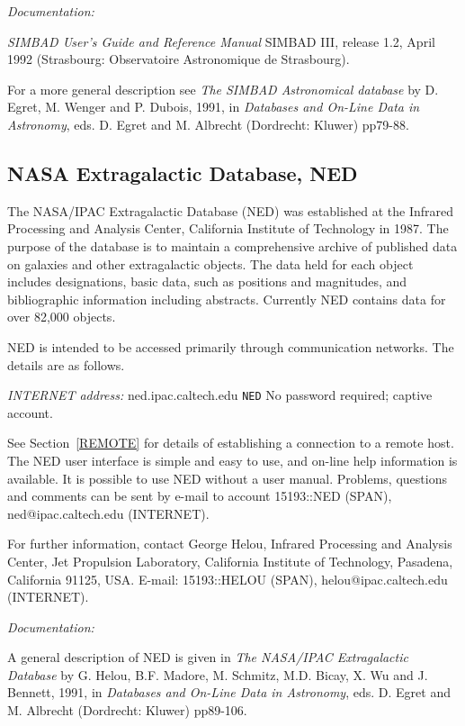 \documentclass[twoside,11pt]{article}
\newcommand{\xlabel}[1]{}
\begin{document}
{\it Documentation:}

{\it SIMBAD User's Guide and Reference Manual} SIMBAD III, release 1.2,
April 1992 (Strasbourg: Observatoire Astronomique de Strasbourg).

For a more general description see {\it The SIMBAD Astronomical
database} by D. Egret, M. Wenger and P. Dubois, 1991, in {\it Databases
and On-Line Data in Astronomy}, eds. D. Egret and M. Albrecht
(Dordrecht: Kluwer) pp79-88.

\subsection{NASA Extragalactic Database, NED
\xlabel{nasa_extragalactic_database_ned}}

The NASA/IPAC Extragalactic Database (NED) was established at the
Infrared Processing and Analysis Center, California Institute of
Technology in 1987. The purpose of the database is to maintain a
comprehensive archive of published data on galaxies and other
extragalactic objects. The data held for each object includes
designations, basic data, such as positions and magnitudes, and
bibliographic information including abstracts. Currently NED contains
data for over 82,000 objects.

NED is intended to be accessed primarily through communication networks.
The details are as follows.

{\it INTERNET address:} ned.ipac.caltech.edu
 \verb-NED-
 No password required; captive account.

See Section~\ref{REMOTE} for details of establishing a connection to
a remote host. The NED user interface is simple and easy to use,
and on-line help information is available. It is possible to use NED
without a user manual. Problems, questions and comments can be sent by
e-mail to account 15193::NED (SPAN), ned@ipac.caltech.edu (INTERNET).

For further information, contact George Helou, Infrared Processing and
Analysis Center, Jet Propulsion Laboratory, California Institute of
Technology, Pasadena, California 91125, USA. E-mail: 15193::HELOU
(SPAN), helou@ipac.caltech.edu (INTERNET).

{\it Documentation:}

A general description of NED is given in {\it The NASA/IPAC
Extragalactic Database} by G. Helou, B.F. Madore, M. Schmitz, M.D.
Bicay, X. Wu and J. Bennett, 1991, in {\it Databases and On-Line Data in
Astronomy}, eds. D. Egret and M. Albrecht (Dordrecht: Kluwer) pp89-106.
\end{document}

